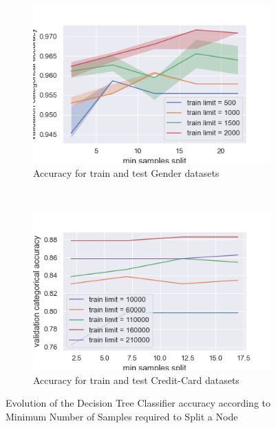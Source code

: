 \documentclass[10pt]{article}
\begin{document}
		\paragraph*{}
			\begin{figure}[h]
				\centering
				\begin{subfigure}[]{0.45\columnwidth}
					\centering
					\includegraphics[width=\linewidth]{../graphics/tree_gender_min_samples_split_score_type_train_limit.png}
					\caption{Accuracy for train and test Gender datasets}
					\label{tree:tree_gender_min_samples_split_score_type_train_limit}
				\end{subfigure}
				~
				\begin{subfigure}[]{0.45\columnwidth}
					\centering
					\includegraphics[width=\linewidth]{../graphics/tree_creditcard_min_samples_split_score_type_train_limit.png}
					\caption{Accuracy for train and test Credit-Card datasets}
					\label{tree:tree_creditcard_min_samples_split_score_type_train_limit}
				\end{subfigure}
				\caption{Evolution of the Decision Tree Classifier accuracy according to Minimum Number of Samples required to Split a Node}
				\label{tree:min_samples_split_score_type_score_type}
			\end{figure}
\end{document}

